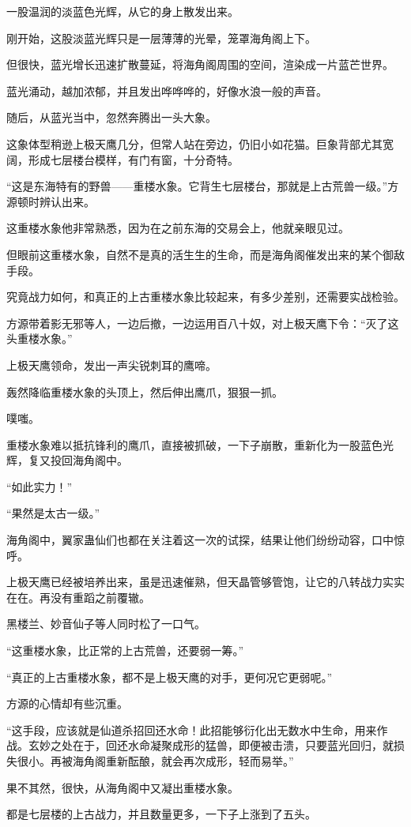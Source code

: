 \begin{this_body}
一股温润的淡蓝色光辉，从它的身上散发出来。

刚开始，这股淡蓝光辉只是一层薄薄的光晕，笼罩海角阁上下。

但很快，蓝光增长迅速扩散蔓延，将海角阁周围的空间，渲染成一片蓝芒世界。

蓝光涌动，越加浓郁，并且发出哗哗哗的，好像水浪一般的声音。

随后，从蓝光当中，忽然奔腾出一头大象。

这象体型稍逊上极天鹰几分，但常人站在旁边，仍旧小如花猫。巨象背部尤其宽阔，形成七层楼台模样，有门有窗，十分奇特。

“这是东海特有的野兽——重楼水象。它背生七层楼台，那就是上古荒兽一级。”方源顿时辨认出来。

这重楼水象他非常熟悉，因为在之前东海的交易会上，他就亲眼见过。

但眼前这重楼水象，自然不是真的活生生的生命，而是海角阁催发出来的某个御敌手段。

究竟战力如何，和真正的上古重楼水象比较起来，有多少差别，还需要实战检验。

方源带着影无邪等人，一边后撤，一边运用百八十奴，对上极天鹰下令：“灭了这头重楼水象。”

上极天鹰领命，发出一声尖锐刺耳的鹰啼。

轰然降临重楼水象的头顶上，然后伸出鹰爪，狠狠一抓。

噗嗤。

重楼水象难以抵抗锋利的鹰爪，直接被抓破，一下子崩散，重新化为一股蓝色光辉，复又投回海角阁中。

“如此实力！”

“果然是太古一级。”

海角阁中，翼家蛊仙们也都在关注着这一次的试探，结果让他们纷纷动容，口中惊呼。

上极天鹰已经被培养出来，虽是迅速催熟，但天晶管够管饱，让它的八转战力实实在在。再没有重蹈之前覆辙。

黑楼兰、妙音仙子等人同时松了一口气。

“这重楼水象，比正常的上古荒兽，还要弱一筹。”

“真正的上古重楼水象，都不是上极天鹰的对手，更何况它更弱呢。”

方源的心情却有些沉重。

“这手段，应该就是仙道杀招回还水命！此招能够衍化出无数水中生命，用来作战。玄妙之处在于，回还水命凝聚成形的猛兽，即便被击溃，只要蓝光回归，就损失很小。再被海角阁重新酝酿，就会再次成形，轻而易举。”

果不其然，很快，从海角阁中又凝出重楼水象。

都是七层楼的上古战力，并且数量更多，一下子上涨到了五头。


\end{this_body}
